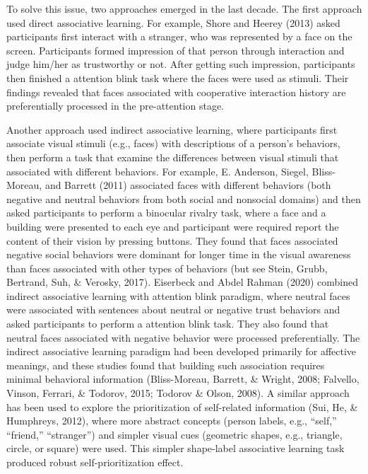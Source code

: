 \documentclass[
  english,
  man]{apa6}
\begin{document}
To solve this issue, two approaches emerged in the last decade. The first approach used direct associative learning. For example, Shore and Heerey (2013) asked participants first interact with a stranger, who was represented by a face on the screen. Participants formed impression of that person through interaction and judge him/her as trustworthy or not. After getting such impression, participants then finished a attention blink task where the faces were used as stimuli. Their findings revealed that faces associated with cooperative interaction history are preferentially processed in the pre-attention stage.

Another approach used indirect associative learning, where participants first associate visual stimuli (e.g., faces) with descriptions of a person's behaviors, then perform a task that examine the differences between visual stimuli that associated with different behaviors. For example, E. Anderson, Siegel, Bliss-Moreau, and Barrett (2011) associated faces with different behaviors (both negative and neutral behaviors from both social and nonsocial domains) and then asked participants to perform a binocular rivalry task, where a face and a building were presented to each eye and participant were required report the content of their vision by pressing buttons. They found that faces associated negative social behaviors were dominant for longer time in the visual awareness than faces associated with other types of behaviors (but see Stein, Grubb, Bertrand, Suh, \& Verosky, 2017). Eiserbeck and Abdel Rahman (2020) combined indirect associative learning with attention blink paradigm, where neutral faces were associated with sentences about neutral or negative trust behaviors and asked participants to perform a attention blink task. They also found that neutral faces associated with negative behavior were processed preferentially. The indirect associative learning paradigm had been developed primarily for affective meanings, and these studies found that building such association requires minimal behavioral information (Bliss-Moreau, Barrett, \& Wright, 2008; Falvello, Vinson, Ferrari, \& Todorov, 2015; Todorov \& Olson, 2008). A similar approach has been used to explore the prioritization of self-related information (Sui, He, \& Humphreys, 2012), where more abstract concepts (person labels, e.g., ``self,'' ``friend,'' ``stranger'') and simpler visual cues (geometric shapes, e.g., triangle, circle, or square) were used. This simpler shape-label associative learning task produced robust self-prioritization effect.
\end{document}
